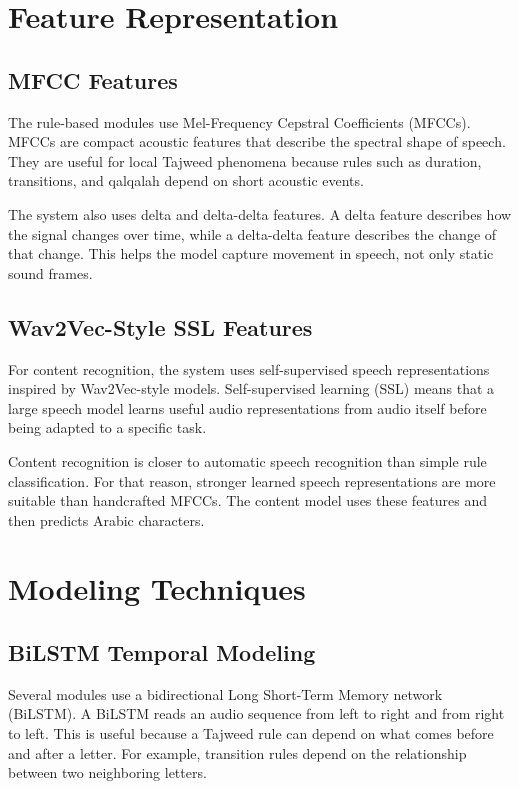 \documentclass[12pt,a4paper]{report}
\begin{document}
\section{Feature Representation}

\subsection{MFCC Features}

The rule-based modules use Mel-Frequency Cepstral Coefficients (MFCCs). MFCCs
are compact acoustic features that describe the spectral shape of speech. They
are useful for local Tajweed phenomena because rules such as duration,
transitions, and qalqalah depend on short acoustic events.

The system also uses delta and delta-delta features. A delta feature describes
how the signal changes over time, while a delta-delta feature describes the
change of that change. This helps the model capture movement in speech, not
only static sound frames.

\subsection{Wav2Vec-Style SSL Features}

For content recognition, the system uses self-supervised speech representations
inspired by Wav2Vec-style models. Self-supervised learning (SSL) means that a
large speech model learns useful audio representations from audio itself before
being adapted to a specific task.

Content recognition is closer to automatic speech recognition than simple rule
classification. For that reason, stronger learned speech representations are
more suitable than handcrafted MFCCs. The content model uses these features and
then predicts Arabic characters.

\section{Modeling Techniques}

\subsection{BiLSTM Temporal Modeling}

Several modules use a bidirectional Long Short-Term Memory network (BiLSTM). A
BiLSTM reads an audio sequence from left to right and from right to left. This
is useful because a Tajweed rule can depend on what comes before and after a
letter. For example, transition rules depend on the relationship between two
neighboring letters.
\end{document}
